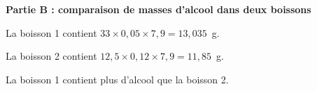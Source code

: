 \textbf{Partie B : comparaison de masses d'alcool dans deux boissons}
%
\smallskip
%
%
%
%
%		
%		
%		
%		
%		
%		

%
La boisson 1 contient $33 \times 0,05 \times 7,9 = 13,035$~g.

La boisson 2 contient $12,5 \times 0,12 \times 7,9 = 11,85$~g.

La boisson 1 contient  plus d'alcool que la boisson 2. 

\bigskip

